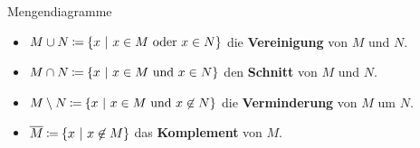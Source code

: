 \documentclass[../../main.tex]{subfiles}
\begin{document}
\begin{nutshell}{Mengendiagramme}
\begin{multicols}{3}
    \end{multicols}
    \begin{itemize}
        \item $M\cup N\mathbin{\coloneqq}\{x~|~x\in M~\text{oder}~x\in N\}$ die \textbf{Vereinigung} von $M$ und $N$.
        \item $M\cap N\mathbin{\coloneqq}\{x~|~x\in M~\text{und}~x\in N\}$ den \textbf{Schnitt} von $M$ und $N$.
        \item $M\setminus N\mathbin{\coloneqq}\{x~|~x\in M~\text{und}~x\not\in N\}$ die \textbf{Verminderung} von $M$ um $N$.
        \item $\overline{M}\mathbin{\coloneqq}\{x~|~x\not\in M\}$ das \textbf{Komplement} von $M$.
    \end{itemize}
\end{nutshell}
\end{document}
